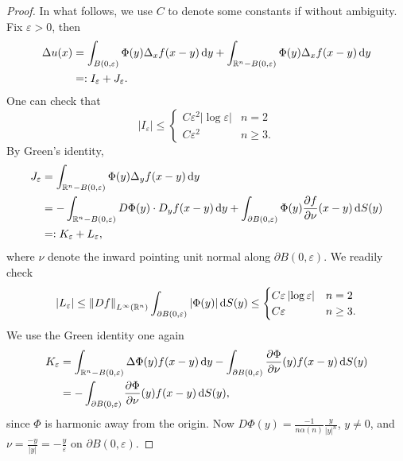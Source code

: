 \begin{proof}
  In what follows, we use \( C \) to denote some constants if without ambiguity.
  Fix \( \varepsilon > 0 \), then
  \begin{align*}
    \Delta u(x) &= \int_{B(0, \varepsilon)} \Phi(y) \Delta_x f(x - y) \mathop{}\!\mathrm{d} y + \int_{\mathbb{R}^n - B(0, \varepsilon)} \Phi(y) \Delta_x f(x - y) \mathop{}\!\mathrm{d} y\\
                &=: I_{\varepsilon} + J_{\varepsilon}.
  \end{align*}
  One can check that
  \[
    \left\lvert I_{\varepsilon} \right\rvert \leq
    \begin{cases}
    C \varepsilon^2 \left\lvert \log \varepsilon \right\rvert & n = 2\\
    C \varepsilon^2 & n \geq 3.
    \end{cases}
  \]
  By Green's identity,
  \begin{align*}
    J_{\varepsilon} &= \int_{\mathbb{R}^n - B(0, \varepsilon)}\Phi(y) \Delta_y f(x - y) \mathop{}\!\mathrm{d} y\\
                    &= - \int_{\mathbb{R}^n - B(0, \varepsilon)} D \Phi(y) \cdot D_y f(x - y) \mathop{}\!\mathrm{d} y + \int_{\partial B(0, \varepsilon)} \Phi(y) \frac{\partial f}{\partial \nu} (x - y) \mathop{}\!\mathrm{d} S(y)\\
                    &=: K_{\varepsilon} + L_{\varepsilon},
  \end{align*}
  where \( \nu \) denote the inward pointing unit normal along \( \partial B(0 ,\varepsilon) \).
  We readily check
  \[
    \left\lvert L_{\varepsilon} \right\rvert \leq \left\lVert Df \right\rVert_{L^{\infty}(\mathbb{R}^n)} \int_{\partial B(0, \varepsilon)} \left\lvert \Phi(y) \right\rvert \mathop{}\!\mathrm{d} S(y)  \leq
    \begin{cases}
    C \varepsilon \left\lvert \log \varepsilon \right\rvert & n = 2\\
    C \varepsilon & n \geq 3.
    \end{cases}
  \]
  We use the Green identity one again
  \begin{align*}
    K_{\varepsilon} &= \int_{\mathbb{R}^n - B(0, \varepsilon)} \Delta \Phi(y) f(x - y) \mathop{}\!\mathrm{d} y - \int_{\partial B(0, \varepsilon)} \frac{\partial \Phi}{\partial \nu}(y) f(x - y) \mathop{}\!\mathrm{d} S(y)\\
                    &= - \int_{\partial B(0, \varepsilon)} \frac{\partial \Phi}{\partial \nu}(y) f(x - y)\mathop{}\!\mathrm{d} S(y),
  \end{align*}
  since \( \Phi \) is harmonic away from the origin.
  Now \( D \Phi(y) = \frac{-1}{n \alpha(n)} \frac{y}{\left\lvert y \right\rvert^n} \), \( y \neq 0 \), and \( \nu = \frac{-y}{\left\lvert y \right\rvert} = -\frac{y}{\varepsilon} \) on \( \partial B(0, \varepsilon) \).

\end{proof}
